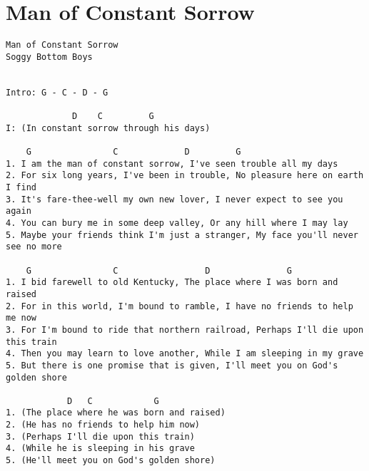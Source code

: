 \documentclass[leqno]{memoir}
\begin{document}
\chapter{Man of Constant Sorrow}
\begin{verbatim}
Man of Constant Sorrow
Soggy Bottom Boys


Intro: G - C - D - G

             D    C         G
I: (In constant sorrow through his days)

    G                C             D         G
1. I am the man of constant sorrow, I've seen trouble all my days 
2. For six long years, I've been in trouble, No pleasure here on earth I find
3. It's fare-thee-well my own new lover, I never expect to see you again
4. You can bury me in some deep valley, Or any hill where I may lay
5. Maybe your friends think I'm just a stranger, My face you'll never see no more

    G                C                 D               G 
1. I bid farewell to old Kentucky, The place where I was born and raised
2. For in this world, I'm bound to ramble, I have no friends to help me now 
3. For I'm bound to ride that northern railroad, Perhaps I'll die upon this train
4. Then you may learn to love another, While I am sleeping in my grave
5. But there is one promise that is given, I'll meet you on God's golden shore

            D   C            G
1. (The place where he was born and raised)
2. (He has no friends to help him now)
3. (Perhaps I'll die upon this train)
4. (While he is sleeping in his grave
5. (He'll meet you on God's golden shore)
\end{verbatim}
\newpage
\end{document}
